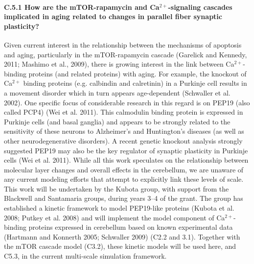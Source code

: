 \documentclass[12pt]{article}
\begin{document}
{\paragraph{C.5.1 How are the mTOR-rapamycin and Ca$^{2+}$-signaling cascades implicated in aging related to changes in parallel fiber synaptic plasticity?} Given current interest in the relationship between the mechanisms of apoptosis and aging, particularly in the mTOR-rapamycin cascade (Garelick and Kennedy, 2011; Mashimo et al., 2009), there is growing interest in the link between Ca$^{2+}$-binding proteins (and related proteins) with aging. For example, the knockout of Ca$^{2+}$ binding proteins (e.g. calbindin and calretinin) in a Purkinje cell results in a movement disorder which in turn appears age-dependent (Schwaller et al. 2002). One specific focus of considerable research in this regard is on PEP19 (also called PCP4) (Wei et al. 2011). This calmodulin binding protein is expressed in Purkinje cells (and basal ganglia) and appears to be strongly related to the sensitivity of these neurons to Alzheimer's and Huntington's diseases (as well as other neurodegenerative disorders). A recent genetic knockout analysis strongly suggested PEP19 may also be the key regulator of synaptic plasticity in Purkinje cells (Wei et al. 2011). While all this work speculates on the relationship between molecular layer changes and overall effects in the cerebellum, we are unaware of any current modeling efforts that attempt to explicitly link these levels of scale. This work will be undertaken by the Kubota group, with support from the Blackwell and Santamaria groups, during years 3--4 of the grant. The group has established a kinetic framework to model PEP19-like proteins (Kubota et al. 2008; Putkey et al. 2008) and will implement the model component of Ca$^{2+}$-binding proteins expressed in cerebellum based on known experimental data (Hartmann and Konnerth 2005; Schwaller 2009) (C2.2 and 3.1). Together with the mTOR cascade model (C3.2), these kinetic models will be used here, and C5.3, in the current multi-scale simulation framework.

}
\end{document}
